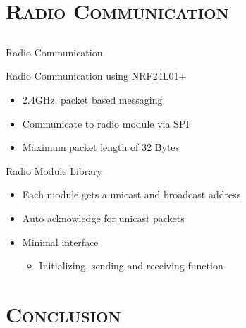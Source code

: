 	\section{\scshape Radio Communication}
	\subsection{}
   \begin{frame}
      \Huge{\centerline{Radio Communication}}
   \end{frame}

	\begin{frame}{Radio Communication using NRF24L01+}
		\begin{itemize}
			\item 2.4GHz, packet based messaging
			\item Communicate to radio module via SPI
			\item Maximum packet length of 32 Bytes
		\end{itemize}
	\end{frame}
	
	\begin{frame}{Radio Module Library}
		\begin{itemize}
			\item Each module gets a unicast and broadcast address
			\item Auto acknowledge for unicast packets
			\item Minimal interface
			\begin{itemize}
				\item Initializing, sending and receiving function
			\end{itemize}
		\end{itemize}
	\end{frame}
	
	
	\section{\scshape Conclusion}
